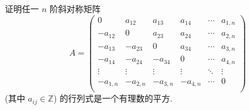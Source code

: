 \documentclass{ctexart}
\begin{document}
\begin{exercise}[有修改]%
    证明任一 $n$ 阶斜对称矩阵
    \[A=\begin{pmatrix}
        0 & a_{12} & a_{13} & a_{14} & \cdots & a_{1,n} \\
        -a_{12} & 0 & a_{23} & a_{24} & \cdots & a_{2,n} \\
        -a_{13} & -a_{23} & 0 & a_{34} & \cdots & a_{3,n} \\
        -a_{14} & -a_{24} & -a_{34} & 0 & \cdots & a_{4,n} \\
        \vdots & \vdots & \vdots & \vdots & \ddots & \vdots \\
        -a_{1,n} & -a_{2,n} & -a_{3,n} & -a_{4,n} & \cdots & 0 \\
    \end{pmatrix}\]
    (其中 $a_{ij}\in\mathbb{Z}$) 的行列式是一个有理数的平方.
\end{exercise}
\end{document}

